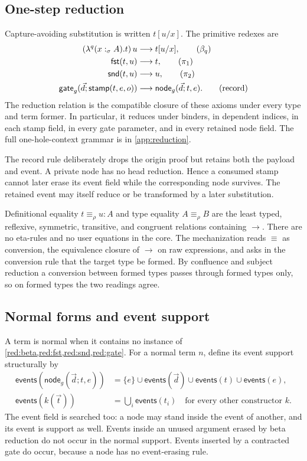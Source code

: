 \documentclass[11pt]{article}
\numberwithin{equation}{section}
\theoremstyle{definition}
\theoremstyle{plain}
\theoremstyle{remark}
\newcommand{\events}{\mathsf{events}}
\newcommand{\jdeq}{\equiv}
\newcommand{\fst}{\AFFst}
\newcommand{\snd}{\AFSnd}
\begin{document}
\subsection{One-step reduction}

Capture-avoiding substitution is written \(t[u/x]\).  The primitive redexes
are
\begin{align}
 (\lambda^q(x:_{\sigma}A).t)\,u
   &\longrightarrow t[u/x],
   \tag{$\beta_q$}\label{red:beta}\\
 \fst(t,u)&\longrightarrow t,
   \tag{$\pi_1$}\label{red:fst}\\
 \snd(t,u)&\longrightarrow u,
   \tag{$\pi_2$}\label{red:snd}\\
 \mathsf{gate}_g(\vec d;\mathsf{stamp}(t,e,o))
   &\longrightarrow \mathsf{node}_g(\vec d;t,e).
   \tag{record}\label{red:gate}
\end{align}
The reduction relation is the compatible closure of these axioms under every
type and term former.  In particular, it reduces under binders, in dependent
indices, in each stamp field, in every gate parameter, and in every retained
node field.  The full one-hole-context grammar is in
\cref{app:reduction}.

The record rule deliberately drops the origin proof but retains both the
payload and event.  A private node has no head reduction.  Hence a consumed
stamp cannot later erase its event field while the corresponding node
survives.  The retained event may itself reduce or be transformed by a later
substitution.

Definitional equality \(t\jdeq_{\rho} u:A\) and type equality
\(A\jdeq_{\rho} B\) are the least typed, reflexive, symmetric, transitive, and
congruent relations containing \(\longrightarrow\).  There are no
eta-rules and no user equations in the core.  The mechanization reads
\(\jdeq\) as conversion, the equivalence closure of \(\longrightarrow\) on raw
expressions, and asks in the conversion rule that the target type be formed.
By confluence and subject reduction a conversion between formed types passes
through formed types only, so on formed types the two readings agree.

\subsection{Normal forms and event support}

A term is normal when it contains no instance of
\cref{red:beta,red:fst,red:snd,red:gate}.  For a normal term \(n\), define its
event support structurally by
\[
\begin{aligned}
 \events(\mathsf{node}_g(\vec d;t,e))
   &=\{e\}\cup\events(\vec d)\cup\events(t)\cup\events(e),\\
 \events(k(\vec t))&=\bigcup_i\events(t_i)
 \quad\text{for every other constructor }k.
\end{aligned}
\]
The event field is searched too: a node may stand inside the event of
another, and its event is support as well.
Events inside an unused argument erased by beta reduction do not occur in the
normal support.  Events inserted by a contracted gate do occur, because a node
has no event-erasing rule.
\end{document}
